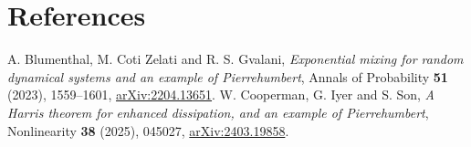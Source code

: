 \documentclass[11pt]{article}
\theoremstyle{definition}
\theoremstyle{remark}
\begin{document}
\section*{References}
\begin{thebibliography}{}
 A. Blumenthal, M. Coti Zelati and R. S. Gvalani, \emph{Exponential mixing for random dynamical systems and an example of Pierrehumbert}, Annals of Probability \textbf{51} (2023), 1559–1601, \href{https://arxiv.org/abs/2204.13651}{arXiv:2204.13651}.
 W. Cooperman, G. Iyer and S. Son, \emph{A Harris theorem for enhanced dissipation, and an example of Pierrehumbert}, Nonlinearity \textbf{38} (2025), 045027, \href{https://arxiv.org/abs/2403.19858}{arXiv:2403.19858}.
\end{thebibliography}
\end{document}
